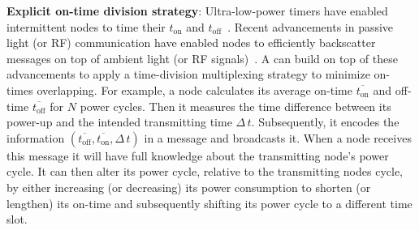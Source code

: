 \noindent \textbf{Explicit on-time division strategy}: 
Ultra-low-power timers have enabled intermittent nodes to time their $t_\text{on}$ and $t_\text{off}$~\cite{hester2017timely}.
%
Recent advancements in passive light (or RF) communication have enabled nodes to efficiently backscatter messages on top of ambient light (or RF signals)~\cite{LuzLink,liu2013ambient}. 
%
A \sys can build on top of these advancements to apply a time-division multiplexing strategy to minimize  on-times overlapping.
%
For example, a node calculates its average on-time $\overline{t_\text{on}}$ and off-time $\overline{t_\text{off}}$ for $N$ power cycles. Then it measures the time difference between its power-up and the intended transmitting time $\Delta\,t$. Subsequently, it encodes the information $({\overline{t_\text{off}}, \overline{t_\text{on}}, \Delta\,t})$ in a message and broadcasts it. When a node receives this message it will have full knowledge about the transmitting node's power cycle. It can then alter its power cycle, relative to the transmitting nodes cycle, by either increasing (or decreasing) its power consumption to shorten (or lengthen) its on-time and subsequently shifting its power cycle to a different time slot. 
% 

